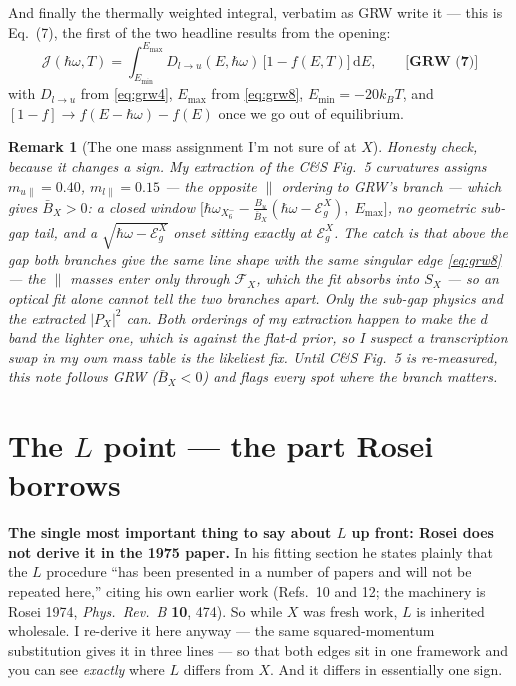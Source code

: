 \documentclass[11pt,a4paper]{article}
\numberwithin{equation}{section}
\newcommand{\hw}{\hbar\omega}
\newcommand{\EgX}{\mathcal{E}_g^{X}}
\newcommand{\cF}{\mathcal{F}}
\newcommand{\cJ}{\mathcal{J}}%
\newcommand{\BX}{\bar{B}_X}
\newcommand{\dd}{\mathrm{d}}
\newcommand{\wXsix}{\hbar\omega_{X_6^-}}
\newcommand{\grweq}[1]{\textbf{[GRW~(#1)]}}
\newtheorem{remark}{Remark}[section]
\begin{document}
And finally the thermally weighted integral, verbatim as GRW write it
--- this is Eq.~(7), the first of the two headline results from the
opening:
\begin{equation}
\cJ(\hw,T)=\int_{E_{\min}}^{E_{\max}}
D_{l\to u}(E,\hw)\,\bigl[1-f(E,T)\bigr]\,\dd E ,
\qquad\grweq{7}
\label{eq:grw7}
\end{equation}
with $D_{l\to u}$ from \eqref{eq:grw4}, $E_{\max}$ from
\eqref{eq:grw8}, $E_{\min}=-20k_BT$, and
$[1-f]\to f(E-\hw)-f(E)$ once we go out of equilibrium.

\begin{remark}[The one mass assignment I'm not sure of at $X$]
\label{rem:massfork}
Honesty check, because it changes a sign. My extraction of the C\&S
Fig.~5 curvatures assigns $m_{u\parallel}=0.40$,
$m_{l\parallel}=0.15$ --- the \emph{opposite} $\parallel$ ordering to
GRW's branch --- which gives $\BX>0$: a \emph{closed} window
$\bigl[\wXsix-\tfrac{B_u}{\BX}(\hw-\EgX),\;E_{\max}\bigr]$, no
geometric sub-gap tail, and a $\sqrt{\hw-\EgX}$ onset sitting exactly
at $\EgX$. The catch is that \emph{above} the gap both branches give
the \emph{same} line shape with the same singular edge
\eqref{eq:grw8} --- the $\parallel$ masses enter only through
$\cF_X$, which the fit absorbs into $S_X$ --- so an optical fit alone
\emph{cannot} tell the two branches apart. Only the sub-gap physics
and the extracted $|P_X|^2$ can. Both orderings of my extraction
happen to make the $d$ band the \emph{lighter} one, which is against
the flat-$d$ prior, so I suspect a transcription swap in my own mass
table is the likeliest fix. Until C\&S Fig.~5 is re-measured, this
note follows GRW ($\BX<0$) and flags every spot where the branch
matters.
\end{remark}

\section{The $L$ point --- the part Rosei borrows}\label{sec:L}

\textbf{The single most important thing to say about $L$ up front:
Rosei does not derive it in the 1975 paper.} In his fitting section he
states plainly that the $L$ procedure ``has been presented in a number
of papers and will not be repeated here,'' citing his own earlier work
(Refs.~10 and 12; the machinery is Rosei 1974, \emph{Phys.\ Rev.\ B}
\textbf{10}, 474). So while $X$ was fresh work, $L$ is inherited
wholesale. I re-derive it here anyway --- the same squared-momentum
substitution gives it in three lines --- so that both edges sit in one
framework and you can see \emph{exactly} where $L$ differs from $X$.
And it differs in essentially one sign.
\end{document}
